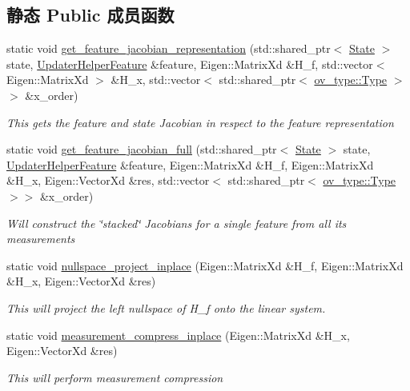 \subsection*{静态 Public 成员函数}
\begin{DoxyCompactItemize}
\item 
static void \hyperlink{classov__msckf_1_1UpdaterHelper_a56158bf8f62681bb1458500589d80aa7}{get\+\_\+feature\+\_\+jacobian\+\_\+representation} (std\+::shared\+\_\+ptr$<$ \hyperlink{classov__msckf_1_1State}{State} $>$ state, \hyperlink{structov__msckf_1_1UpdaterHelper_1_1UpdaterHelperFeature}{Updater\+Helper\+Feature} \&feature, Eigen\+::\+Matrix\+Xd \&H\+\_\+f, std\+::vector$<$ Eigen\+::\+Matrix\+Xd $>$ \&H\+\_\+x, std\+::vector$<$ std\+::shared\+\_\+ptr$<$ \hyperlink{classov__type_1_1Type}{ov\+\_\+type\+::\+Type} $>$$>$ \&x\+\_\+order)
\begin{DoxyCompactList}\small\item\em This gets the feature and state Jacobian in respect to the feature representation \end{DoxyCompactList}\item 
static void \hyperlink{classov__msckf_1_1UpdaterHelper_a83ba71455395ed13bbd15eb9134a6075}{get\+\_\+feature\+\_\+jacobian\+\_\+full} (std\+::shared\+\_\+ptr$<$ \hyperlink{classov__msckf_1_1State}{State} $>$ state, \hyperlink{structov__msckf_1_1UpdaterHelper_1_1UpdaterHelperFeature}{Updater\+Helper\+Feature} \&feature, Eigen\+::\+Matrix\+Xd \&H\+\_\+f, Eigen\+::\+Matrix\+Xd \&H\+\_\+x, Eigen\+::\+Vector\+Xd \&res, std\+::vector$<$ std\+::shared\+\_\+ptr$<$ \hyperlink{classov__type_1_1Type}{ov\+\_\+type\+::\+Type} $>$$>$ \&x\+\_\+order)
\begin{DoxyCompactList}\small\item\em Will construct the \char`\"{}stacked\char`\"{} Jacobians for a single feature from all its measurements \end{DoxyCompactList}\item 
static void \hyperlink{classov__msckf_1_1UpdaterHelper_a5cbdb9addf936d5cf101a9a9bda79f3b}{nullspace\+\_\+project\+\_\+inplace} (Eigen\+::\+Matrix\+Xd \&H\+\_\+f, Eigen\+::\+Matrix\+Xd \&H\+\_\+x, Eigen\+::\+Vector\+Xd \&res)
\begin{DoxyCompactList}\small\item\em This will project the left nullspace of H\+\_\+f onto the linear system. \end{DoxyCompactList}\item 
static void \hyperlink{classov__msckf_1_1UpdaterHelper_a45c5fab93318114f765bf29e9e42a3f3}{measurement\+\_\+compress\+\_\+inplace} (Eigen\+::\+Matrix\+Xd \&H\+\_\+x, Eigen\+::\+Vector\+Xd \&res)
\begin{DoxyCompactList}\small\item\em This will perform measurement compression \end{DoxyCompactList}\end{DoxyCompactItemize}


